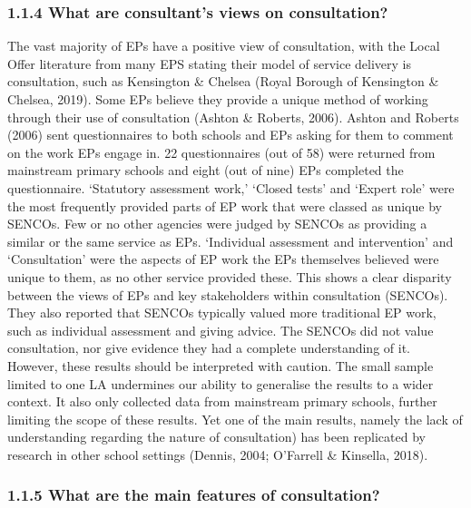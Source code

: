 \documentclass[
  english,
  man]{apa7}
\begin{document}
\hypertarget{what-are-consultants-views-on-consultation}{%
\subsubsection{1.1.4 What are consultant's views on consultation?}\label{what-are-consultants-views-on-consultation}}

The vast majority of EPs have a positive view of consultation, with the Local Offer literature from many EPS stating their model of service delivery is consultation, such as Kensington \& Chelsea (Royal Borough of Kensington \& Chelsea, 2019). Some EPs believe they provide a unique method of working through their use of consultation (Ashton \& Roberts, 2006). Ashton and Roberts (2006) sent questionnaires to both schools and EPs asking for them to comment on the work EPs engage in. 22 questionnaires (out of 58) were returned from mainstream primary schools and eight (out of nine) EPs completed the questionnaire. `Statutory assessment work,' `Closed tests' and `Expert role' were the most frequently provided parts of EP work that were classed as unique by SENCOs. Few or no other agencies were judged by SENCOs as providing a similar or the same service as EPs. `Individual assessment and intervention' and `Consultation' were the aspects of EP work the EPs themselves believed were unique to them, as no other service provided these. This shows a clear disparity between the views of EPs and key stakeholders within consultation (SENCOs). They also reported that SENCOs typically valued more traditional EP work, such as individual assessment and giving advice. The SENCOs did not value consultation, nor give evidence they had a complete understanding of it. However, these results should be interpreted with caution. The small sample limited to one LA undermines our ability to generalise the results to a wider context. It also only collected data from mainstream primary schools, further limiting the scope of these results. Yet one of the main results, namely the lack of understanding regarding the nature of consultation) has been replicated by research in other school settings (Dennis, 2004; O'Farrell \& Kinsella, 2018).

\hypertarget{what-are-the-main-features-of-consultation}{%
\subsubsection{1.1.5 What are the main features of consultation?}\label{what-are-the-main-features-of-consultation}}
\end{document}
